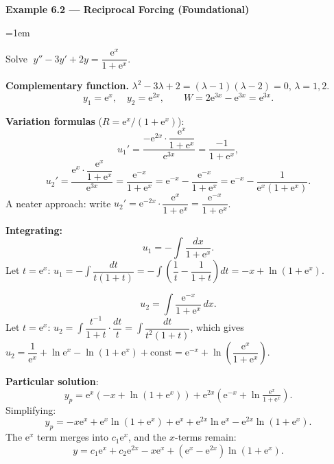 \documentclass[12pt,a4paper]{article}
\newenvironment{example}[1]{%
  \vspace{0.8em}
  \noindent{\footnotesize\scshape\color{orange!50!black} Example}\par
  \noindent\textbf{#1}\par\vspace{0.3em}
  \begin{list}{}{\leftmargin=1em\rightmargin=0pt}\item
}{%
  \end{list}\vspace{0.8em}
}
\newcommand{\ee}{\mathrm{e}}
\begin{document}
\begin{example}{Example 6.2 --- Reciprocal Forcing (Foundational)}
Solve $\;y'' - 3y' + 2y = \dfrac{\ee^x}{1+\ee^x}$.

\medskip
\textbf{Complementary function.}
$\lambda^2-3\lambda+2=(\lambda-1)(\lambda-2)=0$, $\lambda=1,2$.
\[
  y_1 = \ee^x,\quad y_2 = \ee^{2x},\qquad
  W = 2\ee^{3x} - \ee^{3x} = \ee^{3x}.
\]

\textbf{Variation formulas} ($R = \ee^x/(1+\ee^x)$):
\[
  u_1' = \frac{-\ee^{2x}\cdot\dfrac{\ee^x}{1+\ee^x}}{\ee^{3x}}
       = \frac{-1}{1+\ee^x},
\]
\[
  u_2' = \frac{\ee^x\cdot\dfrac{\ee^x}{1+\ee^x}}{\ee^{3x}}
       = \frac{\ee^{-x}}{1+\ee^x} = \ee^{-x} - \frac{\ee^{-x}}{1+\ee^x}
       = \ee^{-x} - \frac{1}{\ee^x(1+\ee^x)}.
\]
A neater approach: write $u_2' = \ee^{-2x}\cdot\dfrac{\ee^x}{1+\ee^x}
= \dfrac{\ee^{-x}}{1+\ee^x}$.

\textbf{Integrating:}
\[
  u_1 = -\int\frac{dx}{1+\ee^x}.
\]
Let $t=\ee^x$: $u_1 = -\int\dfrac{dt}{t(1+t)} = -\int\!\left(\dfrac{1}{t}-\dfrac{1}{1+t}\right)dt
= -x + \ln(1+\ee^x)$.

\[
  u_2 = \int\frac{\ee^{-x}}{1+\ee^x}\,dx.
\]
Let $t=\ee^x$: $u_2 = \int\dfrac{t^{-1}}{1+t}\cdot\dfrac{dt}{t}
= \int\dfrac{dt}{t^2(1+t)}$, which gives
$u_2 = \dfrac{1}{\ee^x} + \ln\ee^x - \ln(1+\ee^x) + \text{const}
= \ee^{-x} + \ln\!\left(\dfrac{\ee^x}{1+\ee^x}\right)$.

\textbf{Particular solution}:
\[
  y_p = \ee^x\!\left(-x + \ln(1+\ee^x)\right)
        + \ee^{2x}\!\left(\ee^{-x} + \ln\tfrac{\ee^x}{1+\ee^x}\right).
\]
Simplifying:
\[
  y_p = -x\ee^x + \ee^x\ln(1+\ee^x) + \ee^x + \ee^{2x}\ln\ee^x
        - \ee^{2x}\ln(1+\ee^x).
\]
The $\ee^x$ term merges into $c_1\ee^x$, and the $x$-terms remain:
\[
  \boxed{y = c_1\ee^x + c_2\ee^{2x} - x\ee^x
          + (\ee^x-\ee^{2x})\ln(1+\ee^x).}
\]
\end{example}

\end{document}

